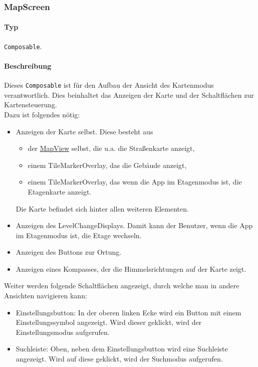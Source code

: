 \subsubsection{MapScreen}\label{App_Map_View_MapScreen}
\paragraph*{Typ}
\texttt{Composable}.
\paragraph*{Beschreibung}
Dieses \texttt{Composable} ist für den Aufbau der Ansicht des Kartenmodus verantwortlich.
Dies beinhaltet das Anzeigen der Karte und der Schaltflächen zur Kartensteuerung.\\
Dazu ist folgendes nötig:
\begin{itemize}
    \item Anzeigen der Karte selbst. Diese besteht aus
        \begin{itemize}
            \item der \href{https://osmdroid.github.io/osmdroid/javadocAll/org/osmdroid/views/MapView.html}
            {MapView} selbst, die u.a. die Straßenkarte anzeigt,
            \item einem TileMarkerOverlay, das die Gebäude anzeigt,
            \item einem TileMarkerOverlay, das wenn die App im Etagenmodus ist, die Etagenkarte anzeigt.
        \end{itemize}
        Die Karte befindet sich hinter allen weiteren Elementen.
    \item Anzeigen des LevelChangeDisplays. Damit kann der Benutzer, wenn die App im Etagenmodus 
    ist, die Etage wechseln.
    \item Anzeigen des Buttons zur Ortung.
    \item Anzeigen eines Kompasses, der die Himmelsrichtungen auf der Karte zeigt.
\end{itemize}
Weiter werden folgende Schaltflächen angezeigt, durch welche man in andere Ansichten navigieren kann:
\begin{itemize}
    \item Einstellungsbutton: In der oberen linken Ecke wird ein Button mit einem Einstellungssymbol angezeigt. 
    Wird dieser geklickt, wird der Einstellungsmodus aufgerufen.
    \item Suchleiste: Oben, neben dem Einstellungsbutton wird eine Suchleiste angezeigt. 
    Wird auf diese geklickt, wird der Suchmodus aufgerufen.
\end{itemize}

